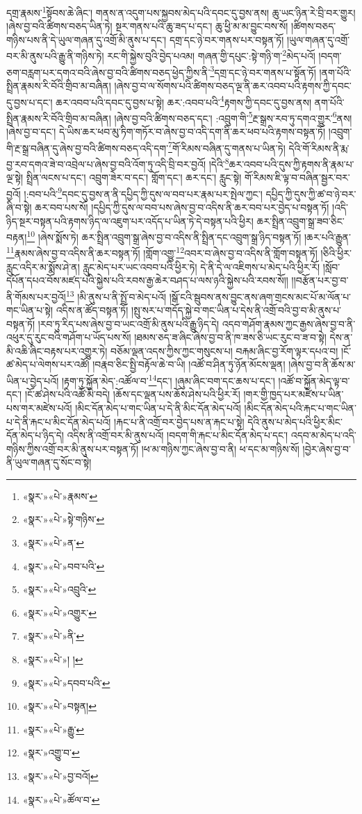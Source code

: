 དགྲ་རྣམས་\footnote{«སྣར་»«པེ་»རྣམས་}སྟོབས་ཆེ་ཞིང་། གནས་ན་འདུག་པས་སྐྱབས་མེད་པའི་དབང་དུ་བྱས་ནས། ཆུ་ཡང་ཉིན་རེ་བྲི་བར་གྱུར། །ཞེས་བྱ་བའི་ཚིགས་བཅད་ཡིན་ཏེ། སྔར་གནས་པའི་ཆུ་ཟད་པ་དང་། ཆུ་ཕྱི་མ་མ་བྱུང་བས་སོ། །ཚིགས་བཅད་གཉིས་པས་ནི་དེ་ཡུལ་གཞན་དུ་འགྲོ་མི་ནུས་པ་དང་། དགྲ་དང་ཉེ་བར་གནས་པར་བསྟན་ཏོ། །ཡུལ་གཞན་དུ་འགྲོ་བར་མི་ནུས་པའི་རྒྱུ་ནི་གཉིས་ཏེ། རང་གི་སྐྱེས་བུའི་བྱེད་པའམ། གཞན་གྱི་དཔུང་:སྟེ་གཉི་ག་\footnote{«སྣར་»«པེ་»སྟེ་གཉིས་}མེད་པའོ། །བདག་ཅག་བརླག་པར་དགའ་བའི་ཞེས་བྱ་བའི་ཚིགས་བཅད་ཕྱེད་ཀྱིས་ནི་\footnote{«སྣར་»«པེ་»ན་}དགྲ་དང་ཉེ་བར་གནས་པ་སྟོན་ཏོ། །ནག་པོའི་སྤྲིན་རྣམས་རི་བོའི་གྲིབ་མ་བཞིན། །ཞེས་བྱ་བ་ལ་སོགས་པའི་ཚིགས་བཅད་ལྔ་ནི་ཆར་འབབ་པའི་རྟགས་ཀྱི་དབང་དུ་བྱས་པ་དང་། ཆར་འབབ་པའི་དབང་དུ་བྱས་པ་སྟེ། ཆར་:འབབ་པའི་\footnote{«སྣར་»«པེ་»བབ་པའི་}རྟགས་ཀྱི་དབང་དུ་བྱས་ནས། ནག་པོའི་སྤྲིན་རྣམས་རི་བོའི་གྲིབ་མ་བཞིན། །ཞེས་བྱ་བའི་ཚིགས་བཅད་དང་། :འབྲུག་གི་\footnote{«སྣར་»«པེ་»འབྲུའི་}རྔ་སྒྲས་རབ་ཏུ་དགའ་གྱུར་\footnote{«སྣར་»«པེ་»འགྱུར་}ནས། །ཞེས་བྱ་བ་དང་། དེ་ཡིས་ཆར་ཕབ་མུ་ཏིག་གཏོར་བ་ཞེས་བྱ་བ་འདི་དག་ནི་ཆར་ཕབ་པའི་རྟགས་བསྟན་ཏོ། །འབྲུག་གི་རྔ་སྒྲ་བཞིན་དུ་ཞེས་བྱ་བའི་ཚིགས་བཅད་འདི་དག་\footnote{«སྣར་»«པེ་»ནི་}གོ་རིམས་བཞིན་དུ་གནས་པ་ཡིན་ཏེ། དེའི་གོ་རིམས་ནི་རྨ་བྱ་རབ་དགའ་ཟེ་བ་འབྲེལ་པ་ཞེས་བྱ་བའི་འོག་ཏུ་འདི་བྲི་བར་བྱའོ། །དེའི་\footnote{«སྣར་»«པེ་»། །}ཆར་འབབ་པའི་དུས་ཀྱི་རྟགས་ནི་རྣམ་པ་ལྔ་སྟེ། སྤྲིན་ལངས་པ་དང་། འབྲུག་ཟེར་བ་དང་། གློག་དང་། ཆར་དང་། རླུང་སྟེ། གོ་རིམས་ཇི་ལྟ་བ་བཞིན་སྦྱར་བར་བྱའོ། །:བབ་པའི་\footnote{«སྣར་»«པེ་»དབབ་པའི་}དབང་དུ་བྱས་ན་ནི་དཔྱིད་ཀྱི་དུས་ལ་བབ་པར་རྣམ་པར་སྤེལ་ཀྱང་། དཔྱིད་ཀྱི་དུས་ཀྱི་ཚ་བ་ཉེ་བར་ཞི་བ་སྟེ། ཆར་བབ་པས་སོ། །དཔྱིད་ཀྱི་དུས་ལ་བབ་པས་ཞེས་བྱ་བ་འདིས་ནི་ཆར་བབ་པར་བྱེད་པ་བསྟན་ཏོ། །འདི་ཉིད་སྔར་བསྟན་པའི་རྟགས་ཉིད་ལ་འཇུག་པར་འདོད་པ་ཡིན་ཏེ་དེ་བསྟན་པའི་ཕྱིར། ཆར་སྤྲིན་འབྲུག་སྒྲ་ཟབ་ཅིང་བརྟན།\footnote{«སྣར་»«པེ་»བསྟན།} །ཞེས་སྨོས་ཏེ། ཆར་སྤྲིན་འབྲུག་སྒྲ་ཞེས་བྱ་བ་འདིས་ནི་སྤྲིན་དང་འབྲུག་སྒྲ་ཉིད་བསྟན་ཏོ། །ཆར་པའི་རྒྱུན་\footnote{«སྣར་»«པེ་»རྒྱུ་}རྣམས་ཞེས་བྱ་བ་འདིས་ནི་ཆར་བསྟན་ཏོ། །གློག་འགྱུ་\footnote{«སྣར་»འགྱུ་བ་}འབར་བ་ཞེས་བྱ་བ་འདིས་ནི་གློག་བསྟན་ཏོ། །ཅིའི་ཕྱིར་རླུང་འདིར་མ་སྨོས་ཤེ་ན། རླུང་མེད་པར་ཡང་འབབ་པའི་ཕྱིར་ཏེ། དེ་ནི་དེ་ལ་འཇིགས་པ་མེད་པའི་ཕྱིར་རོ། །སློབ་དཔོན་དཔའ་བོས་མཛད་པའི་སྐྱེས་པའི་རབས་རྒྱ་ཆེར་བཤད་པ་ལས་ཉའི་སྐྱེས་པའི་རབས་སོ།། །།བརྩོན་པར་བྱ་བ་ནི་གོམས་པར་བྱའོ།\footnote{«སྣར་»«པེ་»བྱ་བའོ།} །མི་ནུས་པ་ནི་སྤྲོ་བ་མེད་པའོ། །སྒོ་ངའི་སྦུབས་ནས་བྱུང་ནས་ཞག་གྲངས་མང་པོ་མ་ལོན་པ་གང་ཡིན་པ་སྟེ། འདིས་ན་ཚོད་བསྟན་ཏོ། །སྤུ་སར་པ་གདོད་སྐྱེ་བ་གང་ཡིན་པ་དེས་ནི་འགྲོ་བའི་བྱ་བ་མི་ནུས་པ་བསྟན་ཏོ། །རབ་ཏུ་རིད་པས་ཞེས་བྱ་བ་ཡང་འགྲོ་མི་ནུས་པའི་རྒྱུ་ཉིད་དེ། འདབ་གཤོག་རྣམས་ཀྱང་རྒྱས་ཞེས་བྱ་བ་ནི་འཕུར་དུ་རུང་བའི་གཤོག་པ་ཡོད་པས་སོ། །ཐམས་ཅད་ཟ་ཞིང་ཞེས་བྱ་བ་ནི་ཁ་ཟས་ཅི་ཡང་རུང་བ་ཟ་བ་སྟེ། དེས་ན་མི་འཆི་ཞིང་བརྟས་པར་འགྱུར་ཏེ། བཅོམ་ལྡན་འདས་ཀྱིས་ཀྱང་གསུངས་པ། བརྐམ་ཞིང་བྱ་རོག་ལྟར་དཔའ་བ། །ངོ་ཚ་མེད་པ་ལེགས་པར་འཚོ། །བརྣབ་ཅིང་སྤྱི་བརྟོལ་ཆེ་བ་ཡི། །འཚོ་བ་ཤིན་ཏུ་ཉོན་མོངས་ལྡན། །ཞེས་བྱ་བ་ནི་ཆོས་མ་ཡིན་པ་བྱེད་པའོ། །རྟག་ཏུ་སྐྱོན་མེད་:འཚོལ་བ་\footnote{«སྣར་»«པེ་»ཚོལ་བ་}དང་། །ཞུམ་ཞིང་བག་དང་ཆས་པ་དང་། །འཚོ་བ་སྐྱོན་མེད་ལྟ་བ་དང་། །ངོ་ཚ་ཤེས་པའི་འཚོ་མི་བདེ། །ཆོས་དང་ལྡན་པས་ཆོས་ཤེས་པའི་ཕྱིར་རོ། །གར་གྱི་ཁྱད་པར་མཛེས་པ་ཡིན་པས་གར་མཛེས་པའོ། །མིང་དོན་མེད་པ་གང་ཡིན་པ་དེ་ནི་མིང་དོན་མེད་པའོ། །མིང་དོན་མེད་པའི་རྐང་པ་གང་ཡིན་པ་དེ་ནི་རྐང་པ་མིང་དོན་མེད་པའོ། །རྐང་པ་ནི་འགྲོ་བར་བྱེད་པས་ན་རྐང་པ་སྟེ། དེའི་ནུས་པ་མེད་པའི་ཕྱིར་མིང་དོན་མེད་པ་ཉིད་དེ། འདིས་ནི་འགྲོ་བར་མི་ནུས་པའོ། །བདག་གི་རྐང་པ་མིང་དོན་མེད་པ་དང་། འདབ་མ་མེད་པ་འདི་གཉིས་ཀྱིས་འགྲོ་བར་མི་ནུས་པར་བསྟན་ཏོ། །ཕ་མ་གཉིས་ཀྱང་ཞེས་བྱ་བ་ནི། ཕ་དང་མ་གཉིས་སོ། །བྱེར་ཞེས་བྱ་བ་ནི་ཡུལ་གཞན་དུ་སོང་བ་སྟེ། 